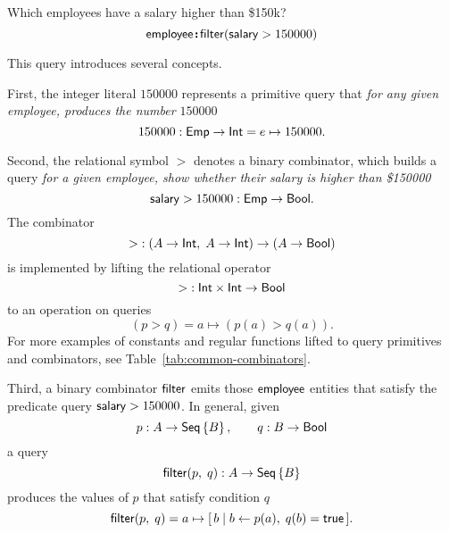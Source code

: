 \begin{example}
    \label{ex:filter-by-salary}
    Which employees have a salary higher than \$150k?
    \begin{equation*}
        \textup{\textsf{employee}}\!\boldsymbol{:}\!\textup{\textsf{filter}}(\textup{\textsf{salary}}>150000)
    \end{equation*}
\end{example}

This query introduces several concepts.

First, the integer literal $150000$ represents a primitive query that
\emph{for any given employee, produces the number $150000$}
\begin{equation*}
    150000 : \textup{\textsf{Emp}} \to \textup{\textsf{Int}} = e \mapsto 150000.
\end{equation*}

Second, the relational symbol ${>}$ denotes a binary combinator, which builds a
query \emph{for a given employee, show whether their salary is higher than
\$150000}
\begin{equation*}
    \textup{\textsf{salary}} > 150000 : \textup{\textsf{Emp}} \to \textup{\textsf{Bool}}.
\end{equation*}
The combinator
\begin{equation*}
    {>} : (A \to \textup{\textsf{Int}},\; A \to \textup{\textsf{Int}}) \to (A \to \textup{\textsf{Bool}})
\end{equation*}
is implemented by lifting the relational operator
\begin{equation*}
    {>} : \textup{\textsf{Int}} \times \textup{\textsf{Int}} \to \textup{\textsf{Bool}}
\end{equation*}
to an operation on queries
\begin{equation*}
    (p > q) = a \mapsto (p(a) > q(a)).
\end{equation*}
For more examples of constants and regular functions lifted to query primitives
and combinators, see Table~\ref{tab:common-combinators}.

Third, a binary combinator $\textup{\textsf{filter}}$ emits those $\textup{\textsf{employee}}$ entities that
satisfy the predicate query $\textup{\textsf{salary}} > 150000$.  In general, given
\begin{equation*}
    p : A \to \textup{\textsf{Seq}}\left\{B\right\}, \qquad q : B \to \textup{\textsf{Bool}}
\end{equation*}
a query
\begin{equation*}
    \textup{\textsf{filter}}(p,\; q) : A \to \textup{\textsf{Seq}}\left\{B\right\}
\end{equation*}
produces the values of $p$ that satisfy condition $q$
\begin{equation*}
    \textup{\textsf{filter}}(p,\; q) = a \mapsto [\,b \mid b \gets p(a),\; q(b)=\textup{\textsf{true}}\,].
\end{equation*}

